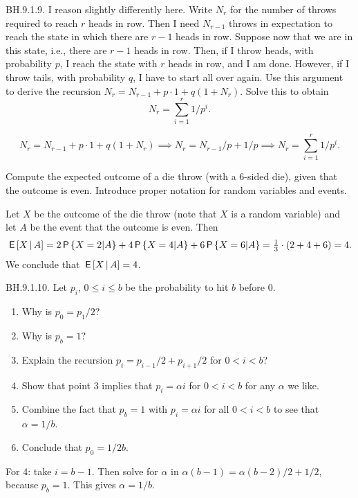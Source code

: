 \begin{exercise}
BH.9.1.9. I reason slightly differently here. Write $N_{r}$ for the number of throws required to reach $r$ heads in row. Then I need $N_{r-1}$ throws in expectation to reach the state in which there are $r-1$ heads in row. Suppose now that we are in this state, i.e.,  there are $r-1$ heads in row. Then, if I throw heads, with probability $p$, I reach the state with $r$ heads in row, and I am done. However, if I throw tails, with probability $q$, I have to start all over again.  Use this argument to derive the recursion $N_{r} = N_{r-1} + p\cdot 1 + q(1+N_{r})$.  Solve this to obtain
\begin{equation}
N_{r} = \sum_{i=1}^{r} 1/p^i.
\end{equation}
\begin{solution}
\begin{equation}
N_{r} = N_{r-1} + p\cdot 1 + q(1+N_{r}) \implies N_{r} = N_{r-1}/p + 1/p \implies N_{r} = \sum_{i=1}^{r} 1/p^i.
\end{equation}
\end{solution}
\end{exercise}



\begin{exercise}
Compute the expected outcome of a die throw (with a 6-sided die), given that the outcome is even. Introduce proper notation for random variables and events.
\begin{solution}
Let $X$ be the outcome of the die throw (note that $X$ is a random variable) and let $A$ be the event that the outcome is even. Then
\begin{equation*}
\,\mathsf{E}\left[X\,\middle|\, A\right] = 2 \,\mathsf{P}\left\{X=2|A\right\} + 4 \,\mathsf{P}\left\{X=4|A\right\} + 6 \,\mathsf{P}\left\{X=6|A\right\} = \tfrac13 \cdot (2+4+6)  = 4.
\end{equation*}
We conclude that $\,\mathsf{E}\left[X\,\middle|\, A\right] = 4$.
\end{solution}
\end{exercise}

\begin{exercise}
BH.9.1.10.  Let $p_i$, $0\leq i\leq b$ be the probability to hit $b$ before $0$.
\begin{enumerate}
\item Why is $p_0=p_1/2$?
\item Why is $p_{b}=1$?
\item Explain the recursion $p_i=p_{i-1}/2 + p_{i+1}/2$ for $0 < i <b$?
\item Show that point $3$ implies that $p_i =  \alpha i$ for $0<i<b$ for any $\alpha$ we like.
\item Combine the fact that $p_{b}=1$ with $p_{i} = \alpha i$ for all $0<i<b$ to see that $\alpha=1/b$.
\item Conclude that $p_0=1/2b$.
\end{enumerate}
\begin{solution}
For 4: take $i=b-1$. Then solve for $\alpha$ in $\alpha(b-1) = \alpha(b-2)/2+1/2$, because $p_{b}=1$. This gives $\alpha=1/b$.
\end{solution}
\end{exercise}



